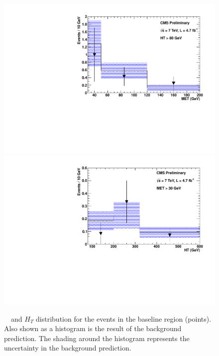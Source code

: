 \begin{figure}[h]
\begin{center}
\includegraphics[width=0.48\linewidth]{figs/Met.pdf}
\includegraphics[width=0.48\linewidth]{figs/Ht.pdf}
\caption{\label{fig:htmet}
\met~~and $H_T$ distribution for the events in the baseline region (points).
Also shown as a histogram is the result of the background prediction.
The shading around the histogram represents the uncertainty
in the background prediction.}
\end{center}
\end{figure}


 





